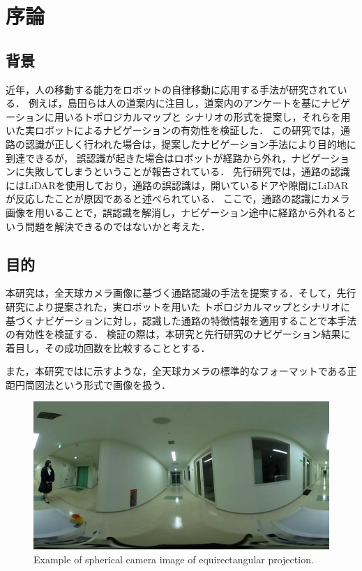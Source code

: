 \documentclass[../main]{subfiles}
\begin{document}
    \setcounter{secnumdepth}{2}
    \chapter{序論}
        \section{背景}
        近年，人の移動する能力をロボットの自律移動に応用する手法が研究されている．
        例えば，島田らは人の道案内に注目し，道案内のアンケートを基にナビゲーションに用いるトポロジカルマップと
        シナリオの形式を提案し，それらを用いた実ロボットによるナビゲーションの有効性を検証した．
        この研究では，通路の認識が正しく行われた場合は，提案したナビゲーション手法により目的地に到達できるが，
        誤認識が起きた場合はロボットが経路から外れ，ナビゲーションに失敗してしまうということが報告されている．
        先行研究では，通路の認識にはLiDARを使用しており，通路の誤認識は，開いているドアや隙間にLiDARが反応したことが原因であると述べられている．
        ここで，通路の認識にカメラ画像を用いることで，誤認識を解消し，ナビゲーション途中に経路から外れるという問題を解決できるのではないかと考えた．

        \newpage

        \section{目的}
        本研究は，全天球カメラ画像に基づく通路認識の手法を提案する．そして，先行研究により提案された，実ロボットを用いた
        トポロジカルマップとシナリオに基づくナビゲーションに対し，認識した通路の特徴情報を適用することで本手法の有効性を検証する．
        検証の際は，本研究と先行研究のナビゲーション結果に着目し，その成功回数を比較することとする．


        また，本研究ではに示すような，全天球カメラの標準的なフォーマットである正距円筒図法という形式で画像を扱う．

        \begin{figure}[H]
            \centering
            \includegraphics[width=15cm]{18F_aisle_exp.jpg}
            \caption{Example of spherical camera image of equirectangular projection.}
            \label{figure::image_exp}
        \end{figure}
        
\end{document}
